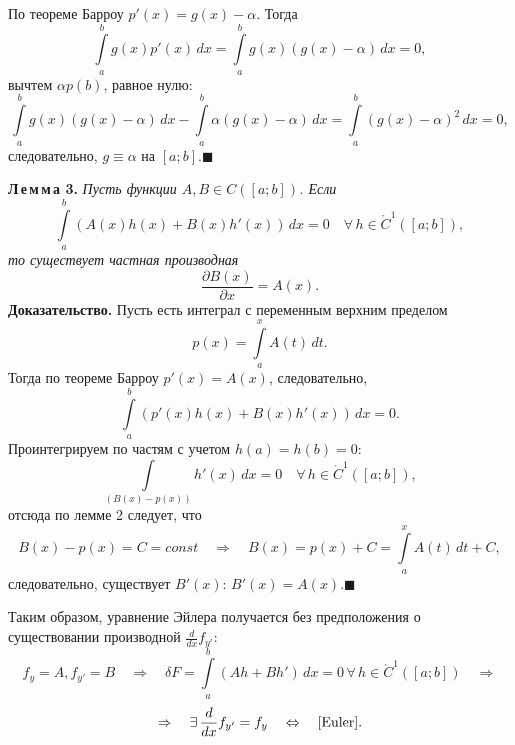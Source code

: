 \documentclass[12pt,a5paper]{book}
\begin{document}
	По теореме Барроу $p'(x) = g(x) - \alpha$. Тогда
	\begin{equation*}
		\int\limits_a^b g(x)p'(x)\,dx = \int\limits_a^b g(x)(g(x) - \alpha)\,dx = 0,
	\end{equation*}
	вычтем $\alpha p(b)$, равное нулю:
	\begin{equation*}
		\int\limits_a^b g(x)(g(x) - \alpha)\,dx - \int\limits_a^b \alpha(g(x) - \alpha)\,dx = \int\limits_a^b (g(x) - \alpha)^2\,dx = 0,
	\end{equation*}
	следовательно, $g \equiv \alpha$ на $[a;b]$.$\blacksquare$
	
	\vspace*{0.5em}
	\noindent \textbf{Л\,е\,м\,м\,а 3.} \textit{Пусть функции $A, B \in C([a;b])$. Если}
	\begin{equation*}
		\int\limits_a^b (A(x)h(x) + B(x)h'(x))\,dx = 0 \quad \forall\,h \in \mathring{C}^1([a;b]),
	\end{equation*}
	\textit{то существует частная производная}
	\begin{equation*}
		\frac{\partial B(x)}{\partial x} = A(x).
	\end{equation*}
	\textbf{Доказательство.} Пусть есть интеграл с переменным верхним пределом
	\begin{equation*}
		p(x) = \int\limits_a^x A(t)\,dt.
	\end{equation*}
	Тогда по теореме Барроу $p'(x) = A(x)$, следовательно,
	\begin{equation*}
		\int\limits_a^b (p'(x)h(x) + B(x)h'(x))\,dx = 0.
	\end{equation*}
	Проинтегрируем по частям с учетом $h(a) = h(b) = 0$:
	\begin{equation*}
		\int\limits_(B(x) - p(x))h'(x)\,dx = 0 \quad \forall\,h \in \mathring{C}^1([a;b]),
	\end{equation*}
	отсюда по лемме 2 следует, что
	\begin{equation*}
		B(x) - p(x) = C = const \quad \Rightarrow \quad B(x) = p(x) + C = \int\limits_a^x A(t)\,dt + C,
	\end{equation*}
	следовательно, существует $B'(x)$: $B'(x) = A(x)$.$\blacksquare$
	
	Таким образом, уравнение Эйлера получается без предположения о существовании производной $\frac{d}{dx}f_{y'}$:
	\begin{equation*}
		f_y = A, f_{y'} = B \quad \Rightarrow \quad \delta F = \int\limits_a^b (Ah + Bh')\,dx = 0 \, \forall\,h \in \mathring{C}^1([a;b]) \quad \Rightarrow
	\end{equation*}
	\begin{equation*}
		\Rightarrow \quad \exists\,\frac{d}{dx}f_{y'} = f_y \quad \Leftrightarrow \quad \eqref{Euler}.
	\end{equation*}
	
\end{document}

